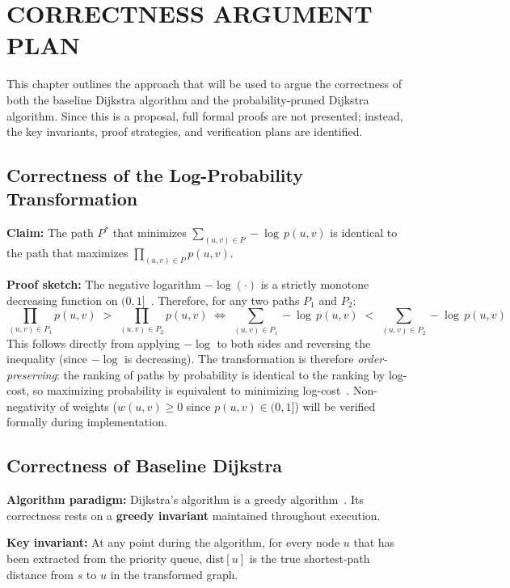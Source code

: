 \chapter{CORRECTNESS ARGUMENT PLAN}\label{chap:correctness}

This chapter outlines the approach that will be used to argue the correctness of both the baseline Dijkstra algorithm and the probability-pruned Dijkstra algorithm. Since this is a proposal, full formal proofs are not presented; instead, the key invariants, proof strategies, and verification plans are identified.

\section{Correctness of the Log-Probability Transformation}

\textbf{Claim:} The path $P^*$ that minimizes $\sum_{(u,v)\in P} -\log\,p(u,v)$ is identical to the path that maximizes $\prod_{(u,v)\in P} p(u,v)$.

\textbf{Proof sketch:} The negative logarithm $-\log(\cdot)$ is a strictly monotone decreasing function on $(0,1]$~\citep{cormen2009}. Therefore, for any two paths $P_1$ and $P_2$:
\[
\prod_{(u,v)\in P_1} p(u,v) \;>\; \prod_{(u,v)\in P_2} p(u,v)
\;\iff\;
\sum_{(u,v)\in P_1} -\log\,p(u,v) \;<\; \sum_{(u,v)\in P_2} -\log\,p(u,v)
\]
This follows directly from applying $-\log$ to both sides and reversing the inequality (since $-\log$ is decreasing). The transformation is therefore \emph{order-preserving}: the ranking of paths by probability is identical to the ranking by log-cost, so maximizing probability is equivalent to minimizing log-cost~\citep{manning2008nlp,viterbi1967error}. Non-negativity of weights ($w(u,v) \geq 0$ since $p(u,v) \in (0,1]$) will be verified formally during implementation.

\section{Correctness of Baseline Dijkstra}\label{sec:correctness_baseline}

\textbf{Algorithm paradigm:} Dijkstra's algorithm is a greedy algorithm~\citep{cormen2009}. Its correctness rests on a \textbf{greedy invariant} maintained throughout execution.

\textbf{Key invariant:} At any point during the algorithm, for every node $u$ that has been extracted from the priority queue, $\text{dist}[u]$ is the true shortest-path distance from $s$ to $u$ in the transformed graph.

